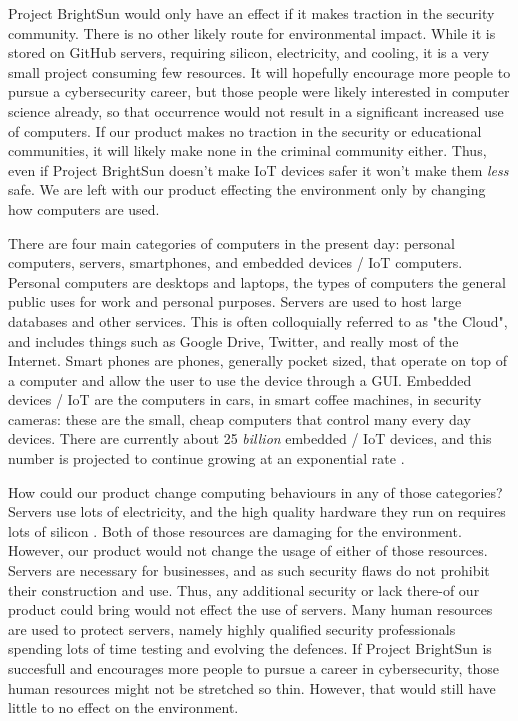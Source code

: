 \documentclass[openright]{report}
\begin{document}
\par Project BrightSun would only have an effect if it makes traction in the security community. There is no other likely route for environmental impact. While it is stored on GitHub servers, requiring silicon, electricity, and cooling, it is a very small project consuming few resources. It will hopefully encourage more people to pursue a cybersecurity career, but those people were likely interested in computer science already, so that occurrence would not result in a significant increased use of computers. If our product makes no traction in the security or educational communities, it will likely make none in the criminal community either. Thus, even if Project BrightSun doesn't make IoT devices safer it won't make them \textit{less} safe. We are left with our product effecting the environment only by changing how computers are used.

\par There are four main categories of computers in the present day: personal computers, servers, smartphones, and embedded devices / IoT computers. Personal computers are desktops and laptops, the types of computers the general public uses for work and personal purposes. Servers are used to host large databases and other services. This is often colloquially referred to as "the Cloud", and includes things such as Google Drive, Twitter, and really most of the Internet. Smart phones are phones, generally pocket sized, that operate on top of a computer and allow the user to use the device through a GUI. Embedded devices / IoT are the computers in cars, in smart coffee machines, in security cameras: these are the small, cheap computers that control many every day devices. There are currently about 25 \textit{billion} embedded / IoT devices, and this number is projected to continue growing at an exponential rate \cite{iot_numbers}. 

\par How could our product change computing behaviours in any of those categories? Servers use lots of electricity, and the high quality hardware they run on requires lots of silicon \cite{datacenter_energy}. Both of those resources are damaging for the environment. However, our product would not change the usage of either of those resources. Servers are necessary for businesses, and as such security flaws do not prohibit their construction and use. Thus, any additional security or lack there-of our product could bring would not effect the use of servers. Many human resources are used to protect servers, namely highly qualified security professionals spending lots of time testing and evolving the defences. If Project BrightSun is succesfull and encourages more people to pursue a career in cybersecurity, those human resources might not be stretched so thin. However, that would still have little to no effect on the environment.
\end{document}
